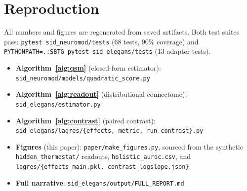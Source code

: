 \documentclass[11pt]{article}
\newcommand{\code}[1]{\texttt{\small #1}}
\begin{document}
\section*{Reproduction}
\small
All numbers and figures are regenerated from saved artifacts. Both test suites pass:
\code{pytest sid\_neuromod/tests} (68 tests, 90\% coverage) and
\code{PYTHONPATH=.:SBTG pytest sid\_elegans/tests} (13 adapter tests).
\begin{itemize}[topsep=2pt,itemsep=1pt,leftmargin=1.4em]
  \item \textbf{Algorithm~\ref{alg:qsm}} (closed-form estimator):
        \code{sid\_neuromod/models/quadratic\_score.py}
  \item \textbf{Algorithm~\ref{alg:readout}} (distributional connectome):
        \code{sid\_elegans/estimator.py}
  \item \textbf{Algorithm~\ref{alg:contrast}} (paired contrast):
        \code{sid\_elegans/lagres/\{effects,\,metric,\,run\_contrast\}.py}
  \item \textbf{Figures} (this paper): \code{paper/make\_figures.py}, sourced from the
        synthetic \code{hidden\_thermostat/} readouts, \code{holistic\_auroc.csv}, and
        \code{lagres/\{effects\_main.pkl,\,contrast\_logslope.json\}}
  \item \textbf{Full narrative}: \code{sid\_elegans/output/FULL\_REPORT.md}
\end{itemize}
\end{document}
